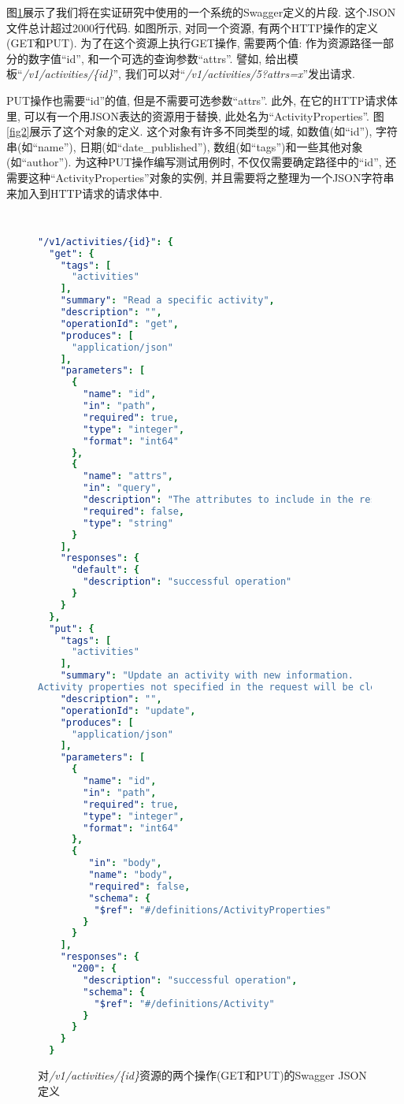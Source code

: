     图\ref{fig1}展示了我们将在实证研究中使用的一个系统的Swagger定义的片段. 这个JSON文件总计超过2000行代码. 如图所示, 对同一个资源, 有两个HTTP操作的定义(GET和PUT). 为了在这个资源上执行GET操作, 需要两个值: 作为资源路径一部分的数字值“id”, 和一个可选的查询参数“attrs”. 譬如, 给出模板“\textit{/v1/activities/\{id\}}”, 我们可以对“\textit{/v1/activities/5?attrs=x}”发出请求. 
    
    PUT操作也需要“id”的值, 但是不需要可选参数“attrs”. 此外, 在它的HTTP请求体里, 可以有一个用JSON表达的资源用于替换, 此处名为“ActivityProperties”. 图\ref{fig2}展示了这个对象的定义. 这个对象有许多不同类型的域, 如数值(如“id”), 字符串(如“name”), 日期(如“date\_published”), 数组(如“tags”)和一些其他对象(如“author”). 为这种PUT操作编写测试用例时, 不仅仅需要确定路径中的“id”, 还需要这种“ActivityProperties”对象的实例, 并且需要将之整理为一个JSON字符串来加入到HTTP请求的请求体中. 
    
    \begin{figure}
      {
      \tt
        \scriptsize
      \begin{lstlisting}[language=yaml]
"/v1/activities/{id}": { 
  "get": {
    "tags": [ 
      "activities"
    ],
    "summary": "Read a specific activity", 
    "description": "",
    "operationId": "get",
    "produces": [
      "application/json" 
    ],
    "parameters": [ 
      {
        "name": "id", 
        "in": "path", 
        "required": true, 
        "type": "integer", 
        "format": "int64"
      }, 
      {
        "name": "attrs",
        "in": "query",
        "description": "The attributes to include in the response. Comma-separated list.", 
        "required": false,
        "type": "string" 
      }
    ], 
    "responses": {
      "default": {
        "description": "successful operation"
      } 
    }
  }, 
  "put": {
    "tags": [ 
      "activities"
    ],
    "summary": "Update an activity with new information.
Activity properties not specified in the request will be cleared.", 
    "description": "", 
    "operationId": "update", 
    "produces": [
      "application/json" 
    ],
    "parameters": [ 
      {
        "name": "id", 
        "in": "path", 
        "required": true, 
        "type": "integer", 
        "format": "int64"
      }, 
      {
         "in": "body", 
         "name": "body", 
         "required": false, 
         "schema": {
          "$ref": "#/definitions/ActivityProperties"
        }
      }
    ],
    "responses": {
      "200": {
        "description": "successful operation",
        "schema": {
          "$ref": "#/definitions/Activity"
        }
      }
    }
  }
        \end{lstlisting}
        }
      \caption[]{对\textit{/v1/activities/\{id\}}资源的两个操作(GET和PUT)的Swagger JSON定义}
        \label{fig1}
    \end{figure}
    

